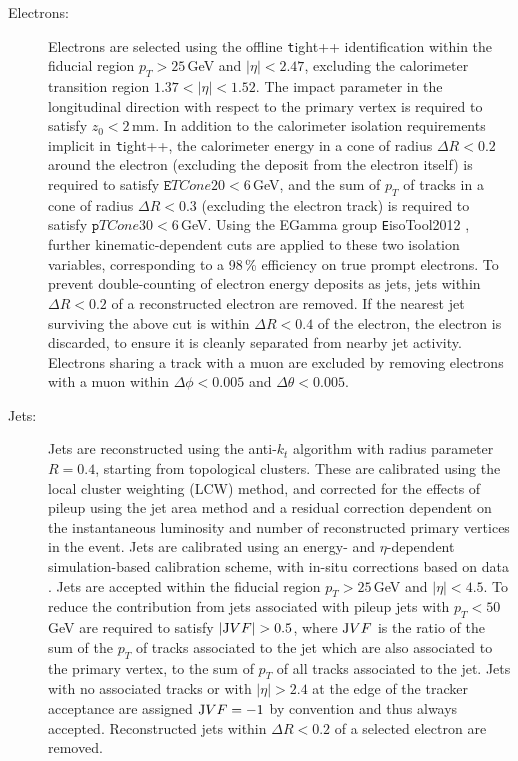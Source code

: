 \begin{description}
\item[Electrons:] Electrons are selected using the offline {\texttt tight++} 
identification within the fiducial region $p_T>25$\,GeV and $|\eta|<2.47$, 
excluding the calorimeter transition region $1.37<|\eta|<1.52$. The impact parameter
in the longitudinal direction with respect to the primary vertex is
required to satisfy $z_0<2$\,mm. In addition 
to the calorimeter isolation requirements implicit in {\texttt tight++},
the calorimeter energy in a cone of radius $\Delta R<0.2$ around the
electron (excluding the deposit from the electron itself) is required
to satisfy ${\texttt ETCone20}<6$\,GeV, and the sum of $p_T$ of tracks
in a cone of radius $\Delta R<0.3$ (excluding the electron track) is
required to satisfy ${\texttt pTCone30}<6$\,GeV. Using the
EGamma group {\texttt EisoTool2012} \cite{eisotool}, further
kinematic-dependent cuts are applied to these two isolation variables,
corresponding to a 98\,\% efficiency on true prompt electrons. 
To prevent double-counting
of electron energy deposits as jets, jets within $\Delta R<0.2$ of 
a reconstructed electron are removed. If the nearest jet surviving
the above cut is within $\Delta R<0.4$ of the electron, the electron
is discarded, to ensure it is cleanly separated from nearby jet activity. Electrons sharing a track with a muon are excluded by removing electrons with a muon within $\Delta \phi < 0.005$ and $\Delta \theta < 0.005$.

\item[Jets:] Jets are reconstructed using the anti-$k_t$ algorithm 
\cite{antikt} with radius parameter $R=0.4$, 
starting from topological clusters. These are calibrated
using the local cluster weighting (LCW) method, and corrected for the
effects of pileup using the jet area method and a residual correction dependent
on the instantaneous luminosity and number of reconstructed primary vertices 
in the event. Jets are calibrated using an energy- and $\eta$-dependent simulation-based calibration scheme, with in-situ corrections 
based on data \cite{jesxi}. Jets are accepted within the fiducial region $p_T>25$\,GeV and $|\eta|<4.5$. To reduce the contribution from jets 
associated with pileup jets with $p_T<50$\,GeV
are required to satisfy $|\textrm JVF|>0.5$, where $\textrm JVF$ is
the ratio of the sum of the $p_T$ of tracks associated to the jet which
are also associated to the primary vertex, to the sum of $p_T$ of all
tracks associated to the jet. Jets with no associated tracks or with
$|\eta|>2.4$ at the edge of the tracker acceptance  are assigned
$\textrm JVF=-1$ by convention and thus always accepted.
Reconstructed jets 
within $\Delta R<0.2$ of a selected electron are removed.


\end{description}
